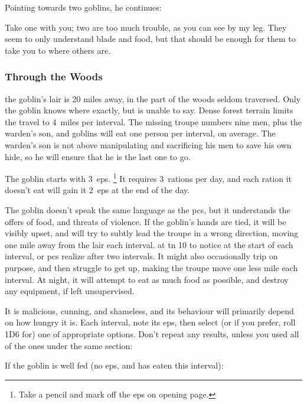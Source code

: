 \documentclass[10pt,twoside]{book}
\begin{document}
Pointing towards two goblins, he continues:

\begin{speechtext}
  Take one with you; two are too much trouble, as you can see by my leg.
  They seem to only understand blade and food, but that should be enough for them to take you to where others are.
\end{speechtext}

\subsubsection{Through the Woods}
the goblin's lair is 20 miles away, in the part of the woods seldom traversed.
Only the goblin knows where exactly, but is unable to say.
Dense forest terrain limits the travel to 4~miles per \gls{interval}.
The missing troupe numbers nine men, plus the \gls{warden}'s son, and goblins will eat one person per \gls{interval}, on average.
The \gls{warden}'s son is not above manipulating and sacrificing his men to save his own hide, so he will ensure that he is the last one to go.

The goblin starts with 3~\glspl{ep}.%
\footnote{Take a pencil and mark off the \glspl{ep} on opening page.}
It requires 3~\glspl{ration} per day, and each \gls{ration} it doesn't eat will gain it 2~\glspl{ep} at the end of the day.

The goblin doesn't speak the same language as the \glspl{pc}, but it understands the offers of food, and threats of violence.
If the goblin's hands are tied, it will be visibly upset, and will try to subtly lead the troupe in a wrong direction, moving one mile away from the lair each \gls{interval}.
 at \gls{tn} 10 to notice at the start of each \gls{interval}, or \glspl{pc} realize after two \glspl{interval}.
It might also occasionally trip on purpose, and then struggle to get up, making the troupe move one less mile each \gls{interval}.
At night, it will attempt to eat as much food as possible, and destroy any equipment, if left unsupervised.

It is malicious, cunning, and shameless, and its behaviour will primarily depend on how hungry it is.
Each \gls{interval}, note its \glspl{ep}, then select (or if you prefer, roll 1D6 for) one of appropriate options.
Don't repeat any results, unless you used all of the ones under the same section:

If the goblin is well fed (no \glspl{ep}, and has eaten this \gls{interval}):
\end{document}

